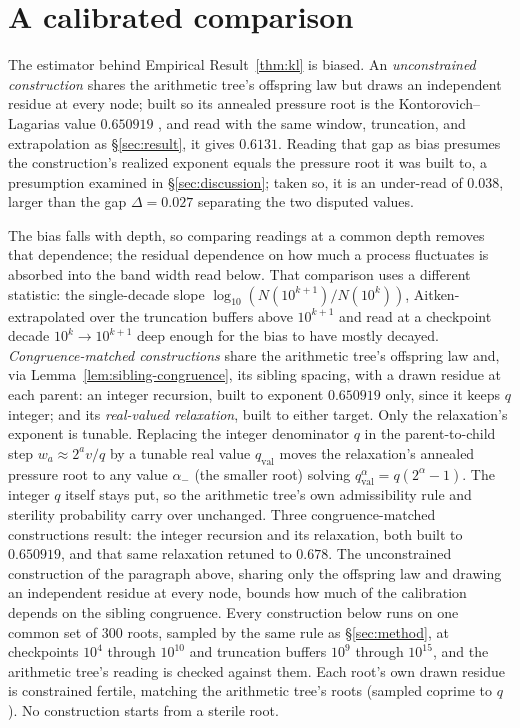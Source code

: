 \documentclass[11pt]{article}
\theoremstyle{remark}
\begin{document}
\section{A calibrated comparison}
\label{sec:calibrated}

The estimator behind Empirical Result~\ref{thm:kl} is biased. An
\emph{unconstrained construction} shares the arithmetic tree's offspring
law but draws an independent residue at every node; built so its
annealed pressure root is the Kontorovich--Lagarias value $0.650919$
\cite{PressureCompanion}, and read with the same window, truncation,
and extrapolation as \S\ref{sec:result}, it gives $0.6131$. Reading
that gap as bias presumes the construction's realized exponent equals
the pressure root it was built to, a presumption examined in
\S\ref{sec:discussion}; taken so, it is an under-read of $0.038$,
larger than the gap $\Delta=0.027$ separating the two disputed values.

The bias falls with depth, so comparing readings at a common depth
removes that dependence; the residual dependence on how much a process
fluctuates is absorbed into the band width read below. That comparison
uses a different statistic: the
single-decade slope $\log_{10}(N(10^{k+1})/N(10^k))$, Aitken-extrapolated
over the truncation buffers above $10^{k+1}$ and read at a checkpoint
decade $10^k\!\to\!10^{k+1}$ deep enough for the bias to have mostly
decayed. \emph{Congruence-matched constructions} share the
arithmetic tree's offspring law and, via
Lemma~\ref{lem:sibling-congruence}, its sibling spacing, with a drawn
residue at each parent: an integer recursion, built to exponent
$0.650919$ only, since it keeps $q$ integer; and its
\emph{real-valued relaxation}, built to either target. Only the
relaxation's exponent is tunable. Replacing the
integer denominator $q$ in the parent-to-child step $w_a\approx2^av/q$
by a tunable real value $q_{\mathrm{val}}$ moves the relaxation's
annealed pressure root to any value $\alpha_-$ (the smaller root)
solving $q_{\mathrm{val}}^{\alpha}=q(2^{\alpha}-1)$. The integer $q$
itself stays put, so the arithmetic tree's own admissibility rule and
sterility probability carry over unchanged. Three congruence-matched constructions result: the integer
recursion and its relaxation, both built to $0.650919$, and that same
relaxation retuned to $0.678$. The unconstrained construction of
the paragraph above, sharing only the offspring law and drawing an
independent residue at every node, bounds how much of the calibration
depends on the sibling congruence. Every
construction below runs on one common set of $300$ roots, sampled by
the same rule as \S\ref{sec:method}, at checkpoints $10^4$ through
$10^{10}$ and truncation buffers $10^9$ through $10^{15}$, and the
arithmetic tree's reading is checked against them. Each root's own
drawn residue is constrained fertile, matching the arithmetic tree's
roots (sampled coprime to $q$). No construction starts from a sterile
root.
\end{document}
